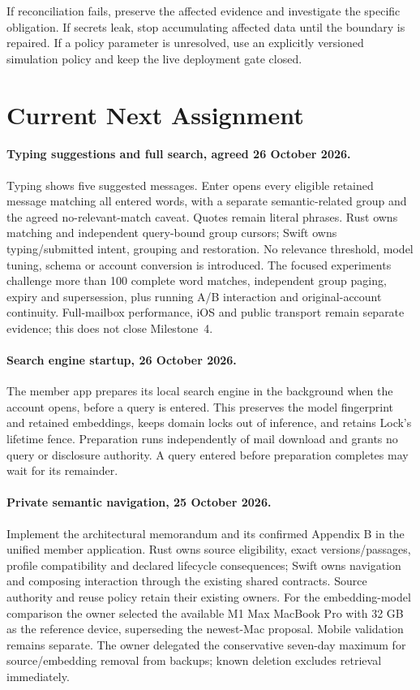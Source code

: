 \documentclass[11pt]{article}
\begin{document}
If reconciliation fails, preserve the affected evidence and investigate the
specific obligation. If secrets leak, stop accumulating affected data until the
boundary is repaired. If a policy parameter is unresolved, use an explicitly
versioned simulation policy and keep the live deployment gate closed.

\section{Current Next Assignment}

\paragraph{Typing suggestions and full search, agreed 26 October 2026.}
Typing shows five suggested messages. Enter opens every eligible retained message
matching all entered words, with a separate semantic-related group and the agreed
no-relevant-match caveat. Quotes remain literal phrases. Rust owns matching and
independent query-bound group cursors; Swift owns typing/submitted intent, grouping
and restoration. No relevance threshold, model tuning, schema or account conversion
is introduced. The focused experiments challenge more than 100 complete word
matches, independent group paging, expiry and supersession, plus running A/B
interaction and original-account continuity. Full-mailbox performance, iOS and
public transport remain separate evidence; this does not close Milestone~4.

\paragraph{Search engine startup, 26 October 2026.}
The member app prepares its local search engine in the background when the account
opens, before a query is entered. This preserves the model fingerprint and retained
embeddings, keeps domain locks out of inference, and retains Lock's lifetime fence.
Preparation runs independently of mail download and grants no query or disclosure
authority. A query entered before preparation completes may wait for its remainder.

\paragraph{Private semantic navigation, 25 October 2026.}
Implement the architectural memorandum and its confirmed Appendix B in the unified
member application. Rust owns source eligibility, exact versions/passages, profile
compatibility and declared lifecycle consequences; Swift owns navigation and composing
interaction through the existing shared contracts. Source authority and reuse policy
retain their existing owners. For the embedding-model comparison the owner selected
the available M1 Max MacBook Pro with 32 GB as the reference device, superseding the
newest-Mac proposal. Mobile validation remains separate. The owner delegated the
conservative seven-day maximum for source/embedding removal
from backups; known deletion excludes retrieval immediately.
\end{document}
